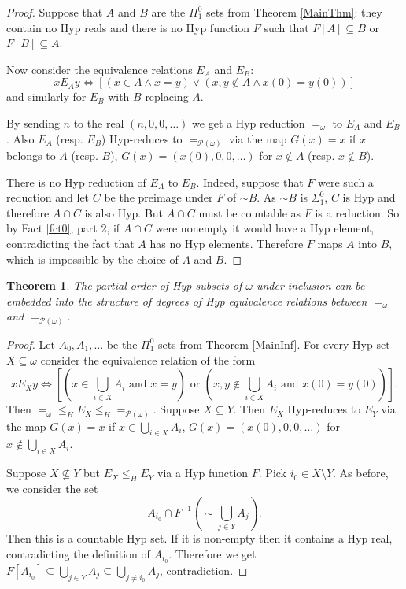 \documentclass[11pt, english]{article}
\newtheorem{thm}{Theorem}
\begin{document}
\begin{proof}
Suppose that $A$ and $B$ are the $\Pi^0_1$ sets from Theorem
\ref{MainThm}: they contain no Hyp reals and there is no Hyp
function $F$ such that $F[A]\subseteq B$ or $F[B]\subseteq A$.

Now consider the equivalence relations $E_{A}$ and $E_{B}$:
$$
xE_{A}y \iff [(x\in A \wedge x=y) \vee
               (x,y\notin A \wedge x(0)=y(0))]
$$
and similarly for $E_B$ with $B$ replacing $A$.

By sending $n$ to the real $(n,0,0,\ldots)$ we get a Hyp reduction
$=_{\omega}$ to $E_{A}$ and $E_{B}$. Also $E_{A}$ (resp. $E_B$)
Hyp-reduces to $=_{\mathcal{P}(\omega)}$ via the map $G(x)=x$ if $x$
belongs to $A$ (resp. $B$), $G(x)=(x(0),0,0,\ldots)$ for $x\notin A$
(resp. $x\notin B$).

There is no Hyp reduction of $E_{A}$ to $E_{B}$. Indeed, suppose
that $F$ were such a reduction and let $C$ be the preimage under $F$
of $\sim B$. As $\sim B$ is $\Sigma^0_1$, $C$ is Hyp and therefore
$A\cap C$ is also Hyp. But $A\cap C$ must be countable as $F$ is a
reduction. So by Fact \ref{fct0}, part 2, if $A\cap C$ were nonempty
it would have a Hyp element, contradicting the fact that $A$ has no
Hyp elements. Therefore $F$ maps $A$ into $B$, which is impossible
by the choice of $A$ and $B$.
\end{proof}

\begin{thm}\label{thm11}
The partial order of Hyp subsets of $\omega$ under inclusion can be
embedded into the structure of degrees of Hyp equivalence relations
between $=_{\omega}$ and $=_{\mathcal{P}(\omega)}$.
\end{thm}

\begin{proof}
Let $A_0,A_1,\ldots$ be the $\Pi^0_1$ sets from Theorem
\ref{MainInf}. For every Hyp set $X\subseteq\omega$ consider the
equivalence relation of the form
$$
xE_{X}y \iff [(x\in \bigcup_{i\in X}A_i \text{ and } x=y) \text{ or }
               (x,y\notin \bigcup_{i\in X}A_i \text{ and }x(0)=y(0))].
$$
Then $=_{\omega}\leq_H E_X\leq_H =_{\mathcal{P}(\omega)}$. Suppose
$X\subseteq Y$. Then $E_{X}$ Hyp-reduces to $E_Y$ via the map
$G(x)=x$ if $x\in\bigcup_{i\in X}A_i$, $G(x)=(x(0),0,0,\ldots)$ for
$x\notin \bigcup_{i\in X}A_i$.

Suppose $X\nsubseteq Y$ but $E_X\leq_H E_Y$ via a Hyp function $F$.
Pick $i_0\in X\setminus Y$. As before, we consider the set
$$
A_{i_0}\cap F^{-1}(\sim\bigcup_{j\in Y}A_j).
$$
Then this is a countable Hyp set. If it is non-empty then it
contains a Hyp real, contradicting the definition of $A_{i_0}$.
Therefore we get $F[A_{i_0}]\subseteq\bigcup_{j\in Y}A_j\subseteq
\bigcup_{j\neq i_0}A_j$, contradiction.
\end{proof}
\end{document}
